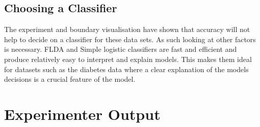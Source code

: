 \documentclass[10pt]{scrreprt}
\begin{document}
\section{Choosing a Classifier}
The experiment and boundary visualisation have shown that accuracy will not help to decide on a classifier for these data sets. As such looking at other factors is necessary. FLDA and Simple logistic classifiers are fast and efficient and produce relatively easy to interpret and explain models. This makes them ideal for datasets such as the diabetes data where a clear explanation of the models decisions is a crucial feature of the model. 

\appendix
\chapter{Experimenter Output}
\label{ch:appendix} 
\end{document}
